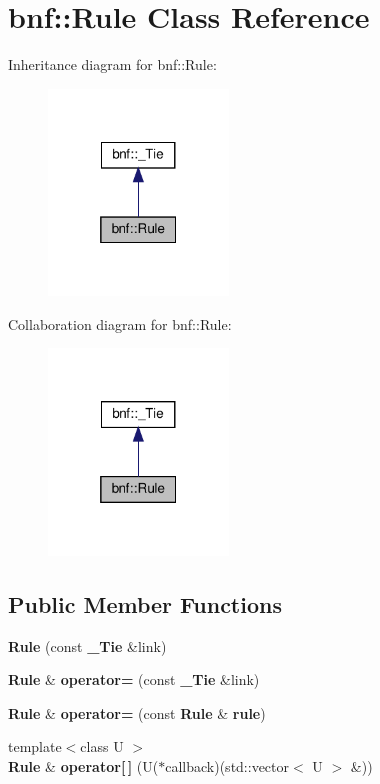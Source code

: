 \section{bnf\+:\+:Rule Class Reference}
\label{classbnf_1_1_rule}


Inheritance diagram for bnf\+:\+:Rule\+:
\nopagebreak
\begin{figure}[H]
\begin{center}
\leavevmode
\includegraphics[width=136pt]{classbnf_1_1_rule__inherit__graph}
\end{center}
\end{figure}


Collaboration diagram for bnf\+:\+:Rule\+:
\nopagebreak
\begin{figure}[H]
\begin{center}
\leavevmode
\includegraphics[width=136pt]{classbnf_1_1_rule__coll__graph}
\end{center}
\end{figure}
\subsection*{Public Member Functions}
\begin{DoxyCompactItemize}
\item 
\mbox{\label{classbnf_1_1_rule_a60dabd7f6981a64c258e7abd92d714a7}} 
{\bfseries Rule} (const \textbf{ \+\_\+\+Tie} \&link)
\item 
\mbox{\label{classbnf_1_1_rule_a67e1acace3996adffbbe39d98407d4fb}} 
\textbf{ Rule} \& {\bfseries operator=} (const \textbf{ \+\_\+\+Tie} \&link)
\item 
\mbox{\label{classbnf_1_1_rule_ae7b4e923d52fd9963747a0192d42e105}} 
\textbf{ Rule} \& {\bfseries operator=} (const \textbf{ Rule} \&\textbf{ rule})
\item 
\mbox{\label{classbnf_1_1_rule_a2c44184d509b95b5d6dc9bed966fe40e}} 
{\footnotesize template$<$class U $>$ }\\\textbf{ Rule} \& {\bfseries operator[$\,$]} (U($\ast$callback)(std\+::vector$<$ U $>$ \&))
\end{DoxyCompactItemize}
